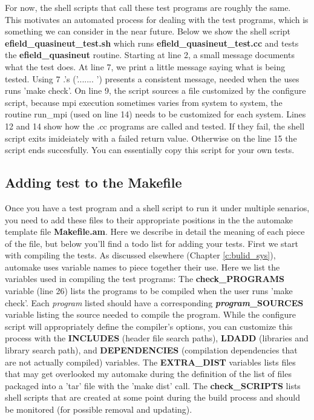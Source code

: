 For now, the shell scripts that call these test programs are roughly
the same. This motivates an automated process for dealing with the
test programs, which is something we can consider in the near
future. Below we show the shell script
\textbf{efield\_quasineut\_test.sh} which runs 
\textbf{efield\_quasineut\_test.cc} and tests the
\textbf{efield\_quasineut} routine. 
%
Starting at line 2, a small message documents what the test does. At
line 7, we print a little message saying what is being tested. Using 7
.'s ('....... ') presents a consistent message, needed when the uses
runs 'make check'. On line 9, the script sources a file customized by
the configure script, because mpi execution sometimes varies from
system to system, the routine run\_mpi (used on line 14) needs to be
customized for each system. Lines 12 and 14 show how the .cc programs
are called and tested. If they fail, the shell script exits
imideiately with a failed return value. Otherwise on the line 15 the
script ends succesfully. You can essentially copy this script for your
own tests. 

\subsection{Adding test to the Makefile}

Once you have a test program and a shell script to run it under
multiple senarios, you need to add these files to their appropriate
positions in the the automake template file \textbf{Makefile.am}. Here
we describe in detail the meaning of each piece of the file, but below
you'll find a todo list for adding your tests. First we start with
compiling the tests. As discussed elsewhere (Chapter
\ref{c:bulid_sys}), automake uses variable names to piece together
their use. Here we list the variables used in compiling the test
programs: 
% 
The \textbf{check\_PROGRAMS} variable (line 26) lists the programs to
be compiled when the user runs 'make check'. Each \emph{program}
listed should have a corresponding \textbf{\emph{program}\_SOURCES}
variable listing the source needed to compile the program. While the
configure script will appropriately define the compiler's options, you
can customize this process with the \textbf{INCLUDES} (header file
search paths), \textbf{LDADD} (libraries and library search path), and
\textbf{DEPENDENCIES} (compilation dependencies that are not actually
compiled) variables. The \textbf{EXTRA\_DIST} variables lists files
that may get overlooked my automake during the definition of the list
of files packaged into a 'tar' file with the 'make dist' call. The
\textbf{check\_SCRIPTS} lists shell scripts that are created at some
point during the build process and should be monitored (for possible
removal and updating).  

